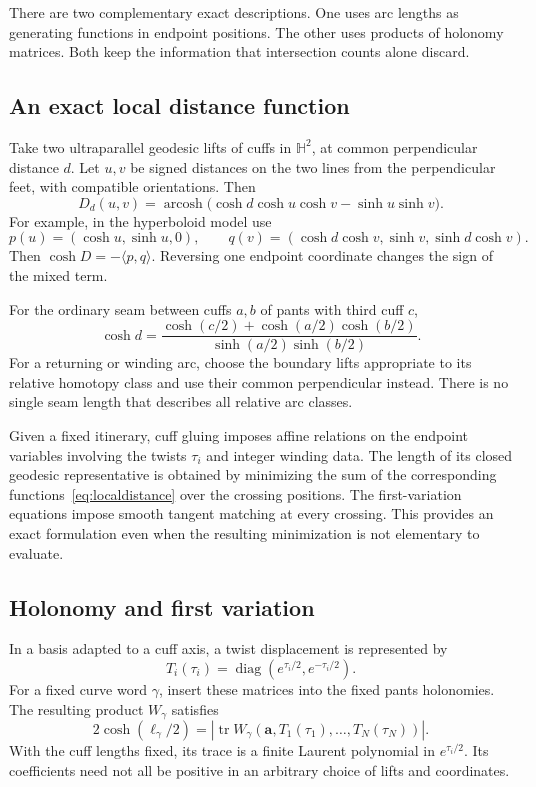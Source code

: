 \documentclass[11pt,a4paper]{article}
\numberwithin{equation}{section}
\theoremstyle{definition}
\theoremstyle{remark}
\DeclareMathOperator{\arcosh}{arcosh}
\DeclareMathOperator{\tr}{tr}
\DeclareMathOperator{\diag}{diag}
\newcommand{\HH}{\mathbb H}
\newcommand{\abs}[1]{\left|#1\right|}
\begin{document}
There are two complementary exact descriptions. One uses arc lengths as
generating functions in endpoint positions. The other uses products of
holonomy matrices. Both keep the information that intersection counts alone
discard.

\subsection{An exact local distance function}

Take two ultraparallel geodesic lifts of cuffs in $\HH^2$, at common
perpendicular distance $d$. Let $u,v$ be signed distances on the two lines
from the perpendicular feet, with compatible orientations. Then
\begin{equation}
 \boxed{
 D_d(u,v)=\arcosh\bigl(\cosh d\cosh u\cosh v-\sinh u\sinh v\bigr).}
 \label{eq:localdistance}
\end{equation}
For example, in the hyperboloid model use
\[
 p(u)=(\cosh u,\sinh u,0),\qquad
 q(v)=(\cosh d\cosh v,\sinh v,\sinh d\cosh v).
\]
Then $\cosh D=-\langle p,q\rangle$. Reversing one endpoint coordinate
changes the sign of the mixed term.

For the ordinary seam between cuffs $a,b$ of pants with third cuff $c$,
\begin{equation}
 \cosh d=\frac{\cosh(c/2)+\cosh(a/2)\cosh(b/2)}
                    {\sinh(a/2)\sinh(b/2)}.
 \label{eq:seam}
\end{equation}
For a returning or winding arc, choose the boundary lifts appropriate to
its relative homotopy class and use their common perpendicular instead.
There is no single seam length that describes all relative arc classes.

Given a fixed itinerary, cuff gluing imposes affine relations on the
endpoint variables involving the twists $\tau_i$ and integer winding
data. The length of its closed geodesic representative is obtained by
minimizing the sum of the corresponding functions~\eqref{eq:localdistance}
over the crossing positions. The first-variation equations impose smooth
tangent matching at every crossing. This provides an exact formulation
even when the resulting minimization is not elementary to evaluate.

\subsection{Holonomy and first variation}

In a basis adapted to a cuff axis, a twist displacement is represented by
\[
 T_i(\tau_i)=\diag(e^{\tau_i/2},e^{-\tau_i/2}).
\]
For a fixed curve word $\gamma$, insert these matrices into the fixed pants
holonomies. The resulting product $W_\gamma$ satisfies
\begin{equation}
 2\cosh(\ell_\gamma/2)
  =\abs{\tr W_\gamma(\mathbf a,T_1(\tau_1),\ldots,T_N(\tau_N))}.
 \label{eq:traceword}
\end{equation}
With the cuff lengths fixed, its trace is a finite Laurent polynomial in
$e^{\tau_i/2}$. Its coefficients need not all be positive in an arbitrary
choice of lifts and coordinates.
\end{document}
